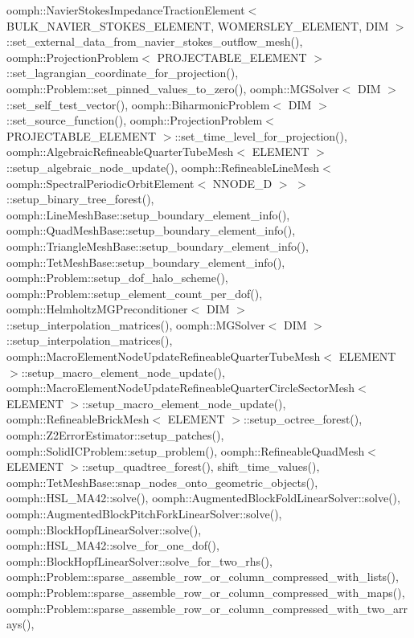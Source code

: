 oomph\+::\+Navier\+Stokes\+Impedance\+Traction\+Element$<$ B\+U\+L\+K\+\_\+\+N\+A\+V\+I\+E\+R\+\_\+\+S\+T\+O\+K\+E\+S\+\_\+\+E\+L\+E\+M\+E\+N\+T, W\+O\+M\+E\+R\+S\+L\+E\+Y\+\_\+\+E\+L\+E\+M\+E\+N\+T, D\+I\+M $>$\+::set\+\_\+external\+\_\+data\+\_\+from\+\_\+navier\+\_\+stokes\+\_\+outflow\+\_\+mesh(), oomph\+::\+Projection\+Problem$<$ P\+R\+O\+J\+E\+C\+T\+A\+B\+L\+E\+\_\+\+E\+L\+E\+M\+E\+N\+T $>$\+::set\+\_\+lagrangian\+\_\+coordinate\+\_\+for\+\_\+projection(), oomph\+::\+Problem\+::set\+\_\+pinned\+\_\+values\+\_\+to\+\_\+zero(), oomph\+::\+M\+G\+Solver$<$ D\+I\+M $>$\+::set\+\_\+self\+\_\+test\+\_\+vector(), oomph\+::\+Biharmonic\+Problem$<$ D\+I\+M $>$\+::set\+\_\+source\+\_\+function(), oomph\+::\+Projection\+Problem$<$ P\+R\+O\+J\+E\+C\+T\+A\+B\+L\+E\+\_\+\+E\+L\+E\+M\+E\+N\+T $>$\+::set\+\_\+time\+\_\+level\+\_\+for\+\_\+projection(), oomph\+::\+Algebraic\+Refineable\+Quarter\+Tube\+Mesh$<$ E\+L\+E\+M\+E\+N\+T $>$\+::setup\+\_\+algebraic\+\_\+node\+\_\+update(), oomph\+::\+Refineable\+Line\+Mesh$<$ oomph\+::\+Spectral\+Periodic\+Orbit\+Element$<$ N\+N\+O\+D\+E\+\_\+D $>$ $>$\+::setup\+\_\+binary\+\_\+tree\+\_\+forest(), oomph\+::\+Line\+Mesh\+Base\+::setup\+\_\+boundary\+\_\+element\+\_\+info(), oomph\+::\+Quad\+Mesh\+Base\+::setup\+\_\+boundary\+\_\+element\+\_\+info(), oomph\+::\+Triangle\+Mesh\+Base\+::setup\+\_\+boundary\+\_\+element\+\_\+info(), oomph\+::\+Tet\+Mesh\+Base\+::setup\+\_\+boundary\+\_\+element\+\_\+info(), oomph\+::\+Problem\+::setup\+\_\+dof\+\_\+halo\+\_\+scheme(), oomph\+::\+Problem\+::setup\+\_\+element\+\_\+count\+\_\+per\+\_\+dof(), oomph\+::\+Helmholtz\+M\+G\+Preconditioner$<$ D\+I\+M $>$\+::setup\+\_\+interpolation\+\_\+matrices(), oomph\+::\+M\+G\+Solver$<$ D\+I\+M $>$\+::setup\+\_\+interpolation\+\_\+matrices(), oomph\+::\+Macro\+Element\+Node\+Update\+Refineable\+Quarter\+Tube\+Mesh$<$ E\+L\+E\+M\+E\+N\+T $>$\+::setup\+\_\+macro\+\_\+element\+\_\+node\+\_\+update(), oomph\+::\+Macro\+Element\+Node\+Update\+Refineable\+Quarter\+Circle\+Sector\+Mesh$<$ E\+L\+E\+M\+E\+N\+T $>$\+::setup\+\_\+macro\+\_\+element\+\_\+node\+\_\+update(), oomph\+::\+Refineable\+Brick\+Mesh$<$ E\+L\+E\+M\+E\+N\+T $>$\+::setup\+\_\+octree\+\_\+forest(), oomph\+::\+Z2\+Error\+Estimator\+::setup\+\_\+patches(), oomph\+::\+Solid\+I\+C\+Problem\+::setup\+\_\+problem(), oomph\+::\+Refineable\+Quad\+Mesh$<$ E\+L\+E\+M\+E\+N\+T $>$\+::setup\+\_\+quadtree\+\_\+forest(), shift\+\_\+time\+\_\+values(), oomph\+::\+Tet\+Mesh\+Base\+::snap\+\_\+nodes\+\_\+onto\+\_\+geometric\+\_\+objects(), oomph\+::\+H\+S\+L\+\_\+\+M\+A42\+::solve(), oomph\+::\+Augmented\+Block\+Fold\+Linear\+Solver\+::solve(), oomph\+::\+Augmented\+Block\+Pitch\+Fork\+Linear\+Solver\+::solve(), oomph\+::\+Block\+Hopf\+Linear\+Solver\+::solve(), oomph\+::\+H\+S\+L\+\_\+\+M\+A42\+::solve\+\_\+for\+\_\+one\+\_\+dof(), oomph\+::\+Block\+Hopf\+Linear\+Solver\+::solve\+\_\+for\+\_\+two\+\_\+rhs(), oomph\+::\+Problem\+::sparse\+\_\+assemble\+\_\+row\+\_\+or\+\_\+column\+\_\+compressed\+\_\+with\+\_\+lists(), oomph\+::\+Problem\+::sparse\+\_\+assemble\+\_\+row\+\_\+or\+\_\+column\+\_\+compressed\+\_\+with\+\_\+maps(), oomph\+::\+Problem\+::sparse\+\_\+assemble\+\_\+row\+\_\+or\+\_\+column\+\_\+compressed\+\_\+with\+\_\+two\+\_\+arrays(), 